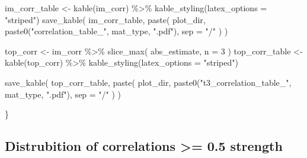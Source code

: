 \documentclass[
]{book}
\newenvironment{Shaded}{\begin{snugshade}}{\end{snugshade}}
\newcommand{\AttributeTok}[1]{\textcolor[rgb]{0.77,0.63,0.00}{#1}}
\newcommand{\DecValTok}[1]{\textcolor[rgb]{0.00,0.00,0.81}{#1}}
\newcommand{\FunctionTok}[1]{\textcolor[rgb]{0.00,0.00,0.00}{#1}}
\newcommand{\NormalTok}[1]{#1}
\newcommand{\OtherTok}[1]{\textcolor[rgb]{0.56,0.35,0.01}{#1}}
\newcommand{\SpecialCharTok}[1]{\textcolor[rgb]{0.00,0.00,0.00}{#1}}
\newcommand{\StringTok}[1]{\textcolor[rgb]{0.31,0.60,0.02}{#1}}
\begin{document}
\begin{Shaded}
\begin{Highlighting}[]
\NormalTok{  im\_corr\_table }\OtherTok{\textless{}{-}} \FunctionTok{kable}\NormalTok{(im\_corr) }\SpecialCharTok{\%\textgreater{}\%}
    \FunctionTok{kable\_styling}\NormalTok{(}\AttributeTok{latex\_options =} \StringTok{"striped"}\NormalTok{)}
  \FunctionTok{save\_kable}\NormalTok{(}
\NormalTok{    im\_corr\_table,}
    \FunctionTok{paste}\NormalTok{(}
\NormalTok{      plot\_dir,}
      \FunctionTok{paste0}\NormalTok{(}\StringTok{"correlation\_table\_"}\NormalTok{, mat\_type, }\StringTok{".pdf"}\NormalTok{),}
      \AttributeTok{sep =} \StringTok{"/"}
\NormalTok{    )}
\NormalTok{  )}

\NormalTok{  top\_corr }\OtherTok{\textless{}{-}}\NormalTok{ im\_corr }\SpecialCharTok{\%\textgreater{}\%}
    \FunctionTok{slice\_max}\NormalTok{(}
\NormalTok{      abs\_estimate,}
      \AttributeTok{n =} \DecValTok{3}
\NormalTok{    )}
\NormalTok{  top\_corr\_table }\OtherTok{\textless{}{-}} \FunctionTok{kable}\NormalTok{(top\_corr) }\SpecialCharTok{\%\textgreater{}\%}
    \FunctionTok{kable\_styling}\NormalTok{(}\AttributeTok{latex\_options =} \StringTok{"striped"}\NormalTok{)}

  \FunctionTok{save\_kable}\NormalTok{(}
\NormalTok{    top\_corr\_table,}
    \FunctionTok{paste}\NormalTok{(}
\NormalTok{      plot\_dir,}
      \FunctionTok{paste0}\NormalTok{(}\StringTok{"t3\_correlation\_table\_"}\NormalTok{, mat\_type, }\StringTok{".pdf"}\NormalTok{),}
      \AttributeTok{sep =} \StringTok{"/"}
\NormalTok{    )}
\NormalTok{  )}

\NormalTok{\}}
\end{Highlighting}
\end{Shaded}

\hypertarget{distrubition-of-correlations-0.5-strength}{%
\subsection{Distrubition of correlations \textgreater= 0.5 strength}\label{distrubition-of-correlations-0.5-strength}}
\end{document}
